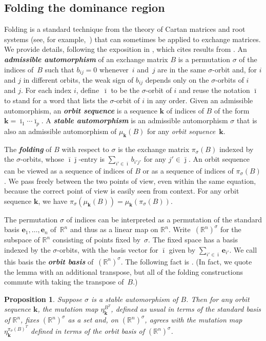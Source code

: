 \documentclass[10pt]{article}
\newtheorem{proposition}{Proposition}[section]
\theoremstyle{definition}
\theoremstyle{remark}
\numberwithin{equation}{section}
\newcommand{\newword}[1]{\textbf{\emph{#1}}}
\newcommand{\reals}{\mathbb R}
\newcommand{\0}{{\mathbf{0}}}
\newcommand{\kk}{{\boldsymbol{k}}}
\newcommand{\e}{\mathbf{e}}
\begin{document}
\subsection{Folding the dominance region}\label{fold sec}
Folding is a standard technique from the theory of Cartan matrices and root systems (see, for example,~\cite{StembridgeFolding}) that can sometimes be applied to exchange matrices.
We provide details, following the exposition in \cite[Sections~2.3--2.4]{VielThesis}, which cites results from \cite{CaoHuangLi,DemonetThesis,DupontNonSimp,NS14}.
An \newword{admissible automorphism} of an exchange matrix $B$ is a permutation $\sigma$ of the indices of~$B$ such that $b_{ij}=0$ whenever~$i$ and~$j$ are in the same $\sigma$-orbit and, for $i$ and $j$ in different orbits, the weak sign of $b_{ij}$ depends only on the $\sigma$-orbits of $i$ and $j$.
For each index $i$, define~$\bar\imath$ to be the $\sigma$-orbit of $i$ and reuse the notation $\bar\imath$ to stand for a word that lists the $\sigma$-orbit of $i$ in any order.
Given an admissible automorphism, an \newword{orbit sequence} is a sequence $\kk$ of indices of $B$ of the form $\kk=\bar\imath_1\cdots\bar\imath_p$.
A \newword{stable automorphism} is an admissible automorphism $\sigma$ that is also an admissible automorphism of $\mu_\kk(B)$ for any \emph{orbit sequence}~$\kk$.

The \newword{folding} of $B$ with respect to $\sigma$ is the exchange matrix $\pi_\sigma(B)$ indexed by the $\sigma$-orbits, whose $\bar\imath\bar\jmath$-entry is $\sum_{i'\in\bar\imath}b_{i'j'}$ for any $j'\in\bar\jmath$.
An orbit sequence can be viewed as a sequence of indices of $B$ or as a sequence of indices of $\pi_\sigma(B)$.
We pass freely between the two points of view, even within the same equation, because the correct point of view is easily seen from context.
For any orbit sequence $\kk$, we have $\pi_\sigma(\mu_\kk(B))=\mu_\kk(\pi_\sigma(B))$.

The permutation $\sigma$ of indices can be interpreted as a permutation of the standard basis $\e_1,\ldots,\e_n$ of~$\reals^n$ and thus as a linear map on $\reals^n$.
Write~$(\reals^n)^\sigma$ for the subspace of $\reals^n$ consisting of points fixed by~$\sigma$.
The fixed space has a basis indexed by the $\sigma$-orbits, with the basis vector for $\bar\imath$ given by $\sum_{i'\in\bar\imath}\e_{i'}$.
We call this basis the \newword{orbit basis} of~$(\reals^n)^\sigma$.
The following fact is \cite[Lemma~2.4.6]{VielThesis}. 
(In fact, we quote the lemma with an additional transpose, but all of the folding constructions commute with taking the transpose of~$B$.)
\begin{proposition}\label{VielLemma}
Suppose $\sigma$ is a stable automorphism of $B$.
Then for any orbit sequence $\kk$, the mutation map $\eta^{B^T}_\kk$, defined as usual in terms of the standard basis of $\reals^n$, fixes $(\reals^n)^\sigma$ as a set and, on $(\reals^n)^\sigma$, agrees with the mutation map $\eta_\kk^{\pi_\sigma(B)^T}$ defined in terms of the orbit basis of $(\reals^n)^\sigma$.
\end{proposition}
\end{document}
